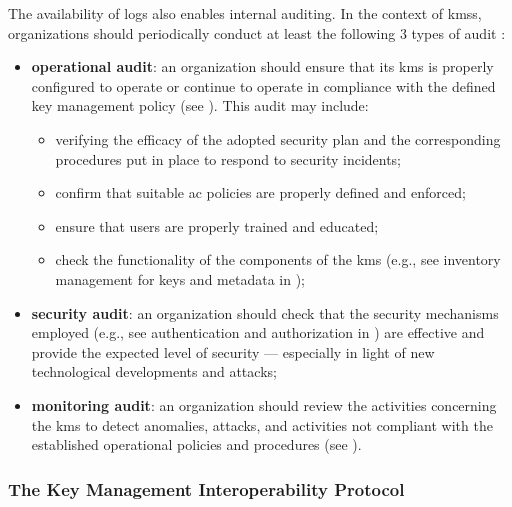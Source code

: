 The availability of logs also enables internal auditing. In the context of \glspl{kms}, organizations should periodically conduct at least the following 3 types of audit \cite{barker_recommendation_2020_p1}:

\begin{itemize}
	\item \textbf{operational audit}: an organization should ensure that its \gls{kms} is properly configured to operate or continue to operate in compliance with the defined key management policy (see ). This audit may include:
	\begin{itemize}
		\item verifying the efficacy of the adopted security plan and the corresponding procedures put in place to respond to security incidents;
		\item confirm that suitable \gls{ac} policies are properly defined and enforced;
		\item ensure that users are properly trained and educated;
		\item check the functionality of the components of the \gls{kms} (e.g., see inventory management for keys and metadata in );
	\end{itemize}
	\item \textbf{security audit}: an organization should check that the security mechanisms employed (e.g., see authentication and authorization in ) are effective and provide the expected level of security --- especially in light of new technological developments and attacks;
	\item \textbf{monitoring audit}: an organization should review the activities concerning the \gls{kms} to detect anomalies, attacks, and activities not compliant with the established operational policies and procedures (see ).
\end{itemize}



\subsubsection{The Key Management Interoperability Protocol}\label{sec:cloud:kmip}

